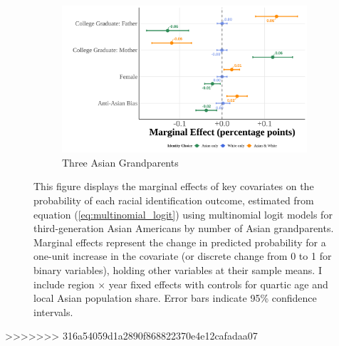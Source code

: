 \begin{center}
\begin{figure}[!htb]
\begin{subfigure}{.45\textwidth}
\caption{Three Asian Grandparents}\label{subfig:threeasiangrand}
\centering
\includegraphics[width=1\linewidth]{optimized_marginal_effects_third_three.png}
\end{subfigure}
\caption*{\footnotesize{This figure displays the marginal effects of key covariates on the probability of each racial identification outcome, estimated from equation (\ref{eq:multinomial_logit}) using multinomial logit models for third-generation Asian Americans by number of Asian grandparents. Marginal effects represent the change in predicted probability for a one-unit increase in the covariate (or discrete change from 0 to 1 for binary variables), holding other variables at their sample means. I include region $\times$ year fixed effects with controls for quartic age and local Asian population share. Error bars indicate 95\% confidence intervals.}}
\end{figure}
\end{center}

\pagebreak
\newpage
>>>>>>> 316a54059d1a2890f868822370e4e12cafadaa07
